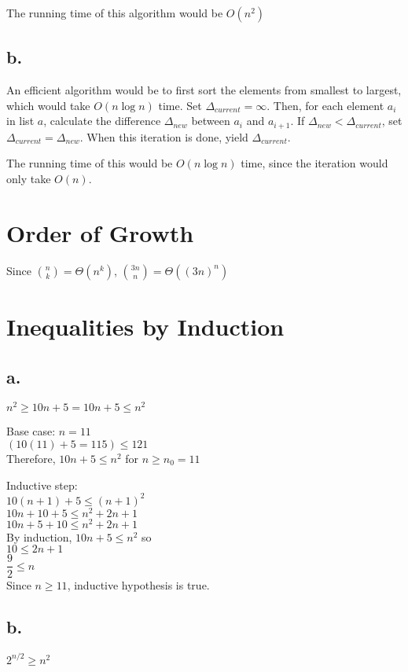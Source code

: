 \documentclass[14pt, letterpaper]{article}
\begin{document}
The running time of this algorithm would be $O(n^2)$

\subsection{b.}
An efficient algorithm would be to first sort the elements from smallest to
largest, which would take $O(n \log n)$ time. Set $\Delta_{current} = \infty$.
Then, for each element $a_i$ in list $a$, calculate the difference
$\Delta_{new}$ between $a_i$ and $a_{i + 1}$. If
$\Delta_{new} < \Delta_{current}$, set $\Delta_{current} = \Delta_{new}$.
When this iteration is done, yield $\Delta_{current}$.

The running time of this would be $O(n \log n)$ time, since the iteration would
only take $O(n)$.

\section{Order of Growth}
Since $\displaystyle {n \choose k} = \Theta(n^k)$, $\displaystyle {3n \choose n} = \Theta((3n)^n)$

\section{Inequalities by Induction}
\subsection{a.}
$n^2 \geq 10n + 5 = 10n + 5 \leq n^2$

Base case: $n = 11$ \\
$(10(11) + 5 = 115) \leq 121$ \\
Therefore, $10n + 5 \leq n^2$ for $n \geq n_0 = 11$

Inductive step: \\
$10(n+1) + 5 \leq (n+1)^2$ \\
$10n + 10 + 5 \leq n^2 + 2n + 1$ \\
$10n + 5 + 10 \leq n^2 + 2n + 1$ \\
By induction, $10n + 5 \leq n^2$ so \\
$10 \leq 2n + 1$ \\
$\dfrac{9}{2} \leq n$ \\
Since $n \geq 11$, inductive hypothesis is true.

\subsection{b.}
$2^{n/2} \geq n^2$
\end{document}

